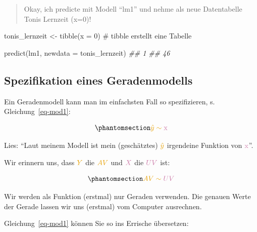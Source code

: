 \documentclass[
  letterpaper,
]{scrbook}
\newenvironment{Shaded}{\begin{snugshade}}{\end{snugshade}}
\newcommand{\AttributeTok}[1]{\textcolor[rgb]{0.40,0.45,0.13}{#1}}
\newcommand{\CommentTok}[1]{\textcolor[rgb]{0.37,0.37,0.37}{#1}}
\newcommand{\DecValTok}[1]{\textcolor[rgb]{0.68,0.00,0.00}{#1}}
\newcommand{\DocumentationTok}[1]{\textcolor[rgb]{0.37,0.37,0.37}{\textit{#1}}}
\newcommand{\FunctionTok}[1]{\textcolor[rgb]{0.28,0.35,0.67}{#1}}
\newcommand{\NormalTok}[1]{\textcolor[rgb]{0.00,0.23,0.31}{#1}}
\newcommand{\OtherTok}[1]{\textcolor[rgb]{0.00,0.23,0.31}{#1}}
\theoremstyle{definition}
\theoremstyle{definition}
\theoremstyle{definition}
\theoremstyle{remark}
\begin{document}
\begin{quote}
{} Okay, ich predicte mit Modell \enquote{lm1} und nehme
als neue Datentabelle Tonis Lernzeit (x=0)!
\end{quote}

\begin{Shaded}
\begin{Highlighting}[]
\NormalTok{tonis\_lernzeit }\OtherTok{\textless{}{-}} \FunctionTok{tibble}\NormalTok{(}\AttributeTok{x =} \DecValTok{0}\NormalTok{)  }\CommentTok{\# \textasciigrave{}tibble\textasciigrave{} erstellt eine Tabelle}
\end{Highlighting}
\end{Shaded}

\begin{Shaded}
\begin{Highlighting}[]
\FunctionTok{predict}\NormalTok{(lm1, }\AttributeTok{newdata =}\NormalTok{ tonis\_lernzeit)}
\DocumentationTok{\#\#  1 }
\DocumentationTok{\#\# 46}
\end{Highlighting}
\end{Shaded}

\subsection{Spezifikation eines
Geradenmodells}\label{spezifikation-eines-geradenmodells}

Ein Geradenmodell kann man im einfachsten Fall so spezifizieren, s.
Gleichung~\ref{eq-mod1}:

\begin{equation}\phantomsection\label{eq-mod1}{\color{ycol}{\hat{y}} \sim \color{xcol}{\text{x}}}\end{equation}

Lies: \enquote{Laut meinem Modell ist mein (geschätztes)
\(\color{ycol}{\hat{y}}\) irgendeine Funktion von
\(\color{xcol}{\text{x}}\)}.

Wir erinnern uns, dass \(\color{ycol}{Y}\) die \(\color{ycol}{AV}\) und
\(\color{xcol}{X}\) die \(\color{xcol}{UV}\) ist:

\begin{equation}\phantomsection\label{eq-mod1}{\color{ycol}{AV} \sim \color{xcol}{UV}}\end{equation}

Wir werden als Funktion (erstmal) nur Geraden verwenden. Die genauen
Werte der Gerade lassen wir uns (erstmal) vom Computer ausrechnen.

Gleichung~\ref{eq-mod1} können Sie so ins Errische übersetzen:
\end{document}
